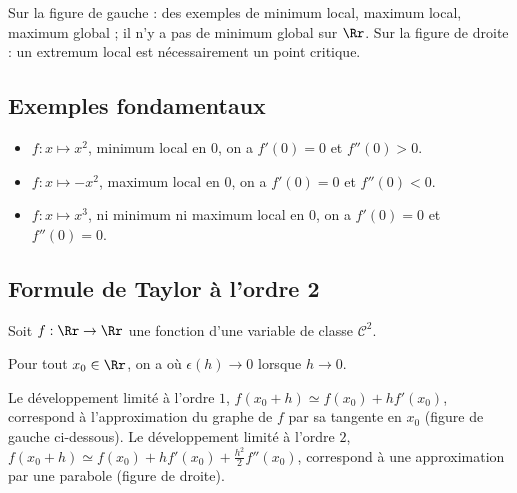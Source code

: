 \documentclass[11pt, class=report,crop=false]{standalone}
\begin{document}
Sur la figure de gauche : des exemples de minimum local, maximum local, maximum global ; il n'y a pas de minimum global sur $\Rr$. Sur la figure de droite : un extremum local est nécessairement un point critique.

\subsection{Exemples fondamentaux}

\begin{itemize}
    \item $f : x \mapsto x^2$, minimum local en $0$, on a $f'(0)=0$ et $f''(0)>0$.
    \item $f : x \mapsto -x^2$, maximum local en $0$, on a $f'(0)=0$ et $f''(0)<0$.
    \item $f : x \mapsto x^3$, ni minimum ni maximum local en $0$, on a $f'(0)=0$ et $f''(0)=0$.      
\end{itemize}


\subsection{Formule de Taylor à l'ordre 2}

Soit $f : \Rr \to \Rr$ une fonction d'une variable de classe $\mathcal{C}^2$. 
\begin{theoreme} 
Pour tout $x_0 \in \Rr$, on a
où $\epsilon(h) \to 0$ lorsque $h\to0$.
\end{theoreme}

Le développement limité à l'ordre $1$, $f(x_0 + h) \simeq f(x_0) + hf'(x_0)$, correspond à l'approximation du graphe de $f$ par sa tangente en $x_0$ (figure de gauche ci-dessous).
Le développement limité à l'ordre $2$, $f(x_0 + h) \simeq f(x_0) + hf'(x_0) + \frac{h^2}{2} f''(x_0)$, correspond à une approximation par une parabole (figure de droite).


\end{document}
